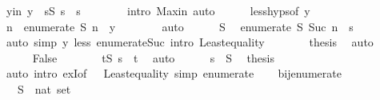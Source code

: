 \begin{isabellebody}
\ y{\isacharunderscore}in{\isacharcolon}\ {\isachardoublequoteopen}{\isacharquery}y\ {\isasymin}\ {\isacharbraceleft}s{\isacharprime}{\isasymin}S{\isachardot}\ s{\isacharprime}\ {\isacharless}\ s{\isacharbraceright}{\isachardoublequoteclose}\isanewline
\ \ \ \ \ \ \isamarkupfalse%
\ {\isacharparenleft}intro\ Max{\isacharunderscore}in{\isacharparenright}\ auto\isanewline
\ \ \ \ \isamarkupfalse%
\ less{\isachardot}hyps{\isacharbrackleft}of\ {\isacharquery}y{\isacharbrackright}\ \isamarkupfalse%
\ n\ \ {\isachardoublequoteopen}enumerate\ S\ n\ {\isacharequal}\ {\isacharquery}y{\isachardoublequoteclose}\isanewline
\ \ \ \ \ \ \isamarkupfalse%
\ auto\isanewline
\ \ \ \ \isamarkupfalse%
\ S\ \isamarkupfalse%
\ {\isachardoublequoteopen}enumerate\ S\ {\isacharparenleft}Suc\ n{\isacharparenright}\ {\isacharequal}\ s{\isachardoublequoteclose}\isanewline
\ \ \ \ \ \ \isamarkupfalse%
\ {\isacharparenleft}auto\ simp{\isacharcolon}\ y\ less\ enumerate{\isacharunderscore}Suc{\isacharprime}{\isacharprime}\ intro{\isacharbang}{\isacharcolon}\ Least{\isacharunderscore}equality{\isacharparenright}\isanewline
\ \ \ \ \isamarkupfalse%
\ \isamarkupfalse%
\ {\isacharquery}thesis\ \isamarkupfalse%
\ auto\isanewline
\ \ \isamarkupfalse%
\isanewline
\ \ \ \ \isamarkupfalse%
\ False\isanewline
\ \ \ \ \isamarkupfalse%
\ \isamarkupfalse%
\ {\isachardoublequoteopen}{\isasymforall}t{\isasymin}S{\isachardot}\ s\ {\isasymle}\ t{\isachardoublequoteclose}\ \isamarkupfalse%
\ auto\isanewline
\ \ \ \ \isamarkupfalse%
\ {\isacartoucheopen}s\ {\isasymin}\ S{\isacartoucheclose}\ \isamarkupfalse%
\ {\isacharquery}thesis\isanewline
\ \ \ \ \ \ \isamarkupfalse%
\ {\isacharparenleft}auto\ intro{\isacharbang}{\isacharcolon}\ exI{\isacharbrackleft}of\ {\isacharunderscore}\ {}{\isacharbrackright}\ Least{\isacharunderscore}equality\ simp{\isacharcolon}\ enumerate{\isacharunderscore}{}{\isacharparenright}\isanewline
\ \ \isamarkupfalse%
\isanewline
{}\isamarkupfalse%
%
\endisatagproof
{\isafoldproof}%
%
\isadelimproof
\isanewline
%
\endisadelimproof
\isanewline
{}\isamarkupfalse%
\ bij{\isacharunderscore}enumerate{\isacharcolon}\isanewline
\ \ \ S\ {\isacharcolon}{\isacharcolon}\ {\isachardoublequoteopen}nat\ set{\isachardoublequoteclose}\isanewline

\end{isabellebody}
